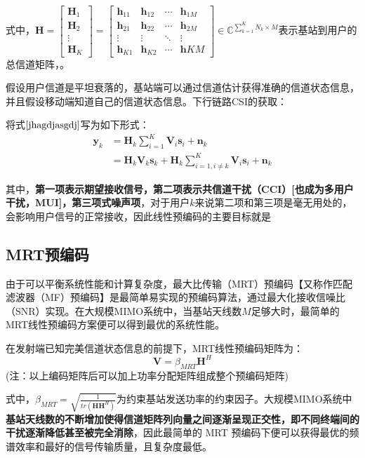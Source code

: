 式中，$\bm{H}=\begin{bmatrix}
    \bm{H}_1 \\
    \bm{H}_2 \\
    \vdots \\
    \bm{H}_K 
\end{bmatrix}=\begin{bmatrix}
    \bm{h}_{11} & \bm{h}_{12} & \cdots & \bm{h}_{1M} \\
    \bm{h}_{21} & \bm{h}_{22} & \cdots & \bm{h}_{2M} \\
    \vdots      & \vdots      & \ddots & \vdots      \\
    \bm{h}_{K1} & \bm{h}_{K2} & \cdots & \bm{h}{KM}
\end{bmatrix} \in \mathbb{C}^{\sum_{k=1}^{K}N_k\times M}$表示基站到用户的总信道矩阵，{。}\par 
假设用户信道是平坦衰落的，基站端可以通过信道估计获得准确的信道状态信息，并且假设移动端知道自己的信道状态信息。下行链路CSI的获取：{\color{yellow}{TDD$\Longrightarrow$利用上下行信道互译性原理；FDD$\Longrightarrow$CSI反馈。}}\par 
将式$\ref{jhagdjasgdj}$写为如下形式：
\begin{equation}
    \begin{aligned}
        \bm{y}_k&=\bm{H}_k\sum_{i=1}^{K}\bm{V}_i\bm{s}_i+\bm{n}_k \\
        &=\bm{H}_k\bm{V}_k\bm{s}_k+\bm{H}_k\sum_{i=1,i\neq k}^{K}\bm{V}_i\bm{s}_i+\bm{n}_k
    \end{aligned}
    \label{sjkagdjhagdjhkasgf}
\end{equation}\par 
其中，\textbf{第一项表示期望接收信号，第二项表示共信道干扰（CCI）[也成为多用户干扰，MUI]，第三项式噪声项}，对于用户$k$来说第二项和第三项是毫无用处的，会影响用户信号的正常接收，因此线性预编码的主要目标就是{\color{yellow}{在一定的功率限制条件下，使得共信道干扰和噪声项的影响尽量小，最大化期望接收信号。}}
\subsection{MRT预编码}
由于可以平衡系统性能和计算复杂度，最大比传输（MRT）预编码【又称作匹配滤波器（MF）预编码】是最简单易实现的预编码算法，通过最大化接收信噪比（SNR）实现。在大规模MIMO系统中，当基站天线数$M$足够大时，最简单的MRT线性预编码方案便可以得到最优的系统性能。\par 
在发射端已知完美信道状态信息的前提下，MRT线性预编码矩阵为：
\begin{equation}
    \bm{V}=\beta_{MRT}\bm{H}^H
\end{equation} 
(注：以上编码矩阵后可以加上功率分配矩阵组成整个预编码矩阵)\par
式中，$\beta_{MRT}=\sqrt{\frac{1}{tr(\bm{H}\bm{H}^H)}}$为约束基站发送功率的约束因子。大规模MIMO系统中\textbf{基站天线数的不断增加使得信道矩阵列向量之间逐渐呈现正交性，即不同终端间的干扰逐渐降低甚至被完全消除}，因此最简单的 MRT 预编码下便可以获得最优的频谱效率和最好的信号传输质量，且复杂度最低。\par 

